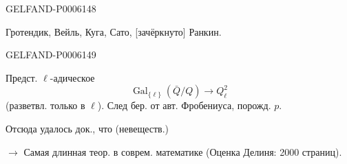 \begin{GelfandAdjacentEvidence}{GELFAND-P000614}{8}

Гротендик, Вейль, Куга, Сато, [зачёркнуто] Ранкин.
\end{GelfandAdjacentEvidence}
\begin{GelfandAdjacentEvidence}{GELFAND-P000614}{9}

Предст. \(\ell\)-адическое
\[
\operatorname{Gal}_{\{\ell\}}(\bar Q/Q)\longrightarrow Q_\ell^2
\]
(разветвл. только в \(\ell\)).
След бер. от авт. Фробениуса, порожд. \(p\).

Отсюда удалось док., что  (невеществ.)
\end{GelfandAdjacentEvidence}

\(\longrightarrow\) Самая длинная теор. в соврем. математике (Оценка Делиня: 2000 страниц).


